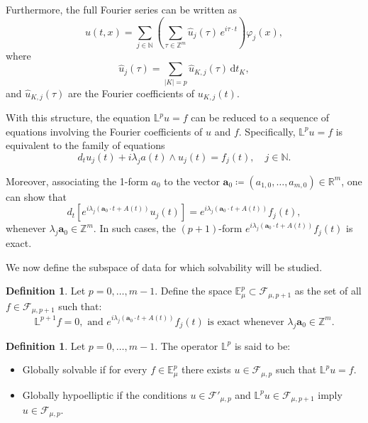 \documentclass[12pt,reqno]{amsart}
\theoremstyle{definition}
\newtheorem{definition}[theorem]{Definition}
\numberwithin{equation}{section}
\begin{document}
Furthermore, the full Fourier series can be written as
\[
u(t,x) = \sum_{j \in \mathbb{N}} \left( \sum_{\tau \in \mathbb{Z}^m} \widehat{u}_j(\tau) \, e^{i \tau \cdot t} \right) \varphi_j(x),
\]
where
\[
\widehat{u}_j(\tau) = \sum_{|K|=p} \widehat{u}_{K,j}(\tau) \, \mathrm{d}t_K,
\]
and $\widehat{u}_{K,j}(\tau)$ are the Fourier coefficients of $u_{K,j}(t)$.


With this structure, the equation $\mathbb{L}^p u = f$ can be reduced to a sequence of equations involving the Fourier coefficients of $u$ and $f$. Specifically, $\mathbb{L}^p u = f$ is equivalent to the family of equations
\[
d_t u_j(t) + i \lambda_j a(t) \wedge u_j(t) = f_j(t), \quad j \in \mathbb{N}.
\]

Moreover, associating the 1-form $a_0$ to the vector $\boldsymbol{a}_0 \coloneqq (a_{1,0}, \ldots, a_{m,0}) \in \mathbb{R}^m$, one can show that
\[
d_t\left[e^{i \lambda_j (\boldsymbol{a}_0 \cdot t + A(t))} u_j(t) \right] = e^{i \lambda_j (\boldsymbol{a}_0 \cdot t + A(t))} f_j(t),
\]
whenever $\lambda_j \boldsymbol{a}_0 \in \mathbb{Z}^m$. In such cases, the $(p+1)$-form $e^{i \lambda_j (\boldsymbol{a}_0 \cdot t + A(t))} f_j(t)$ is exact.

We now define the subspace of data for which solvability will be studied.

\begin{definition}
	Let $p = 0, \ldots, m - 1$. Define the space $\mathbb{E}_\mu^p \subset \mathscr{F}_{\mu,p+1}$ as the set of all $f \in \mathscr{F}_{\mu,p+1}$ such that:
	\[
	\mathbb{L}^{p+1} f = 0, \mbox{ and } e^{i \lambda_j (\boldsymbol{a}_0 \cdot t + A(t))} f_j(t) \mbox{ is exact whenever } \lambda_j \boldsymbol{a}_0 \in \mathbb{Z}^m.
	\]
\end{definition}


\begin{definition}
	Let $p = 0, \ldots, m - 1$. The operator $\mathbb{L}^p$ is said to be:
	\begin{itemize}
		\item Globally solvable if for every $f \in \mathbb{E}_\mu^p$ there exists $u \in \mathscr{F}_{\mu,p}$ such that $\mathbb{L}^p u = f$.
		
		\item Globally hypoelliptic if the conditions $u \in \mathscr{F}'_{\mu,p}$ and $\mathbb{L}^p u \in \mathscr{F}_{\mu,p+1}$ imply $u \in \mathscr{F}_{\mu,p}$.
	\end{itemize}
\end{definition}


\end{document}
